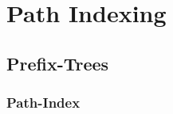 
\section{Path Indexing}
\subsection{Prefix-Trees}

\begin{frame}
	\frametitle{Path-Index}
	
\end{frame}

\begin{frame}
	
\end{frame}

